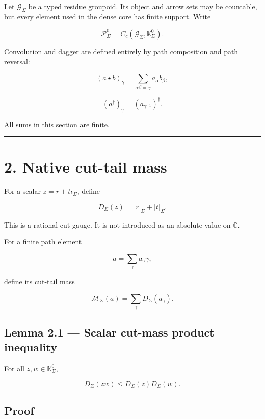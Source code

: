Let \(\mathscr G_\Sigma\) be a typed residue groupoid. Its object and arrow sets
may be countable, but every element used in the dense core has finite support.
Write

\[
\mathscr P_\Sigma^0
=
C_c(\mathscr G_\Sigma,\mathbb K_\Sigma^0).
\]

Convolution and dagger are defined entirely by path composition and path
reversal:

\[
(a\star b)_\gamma
=
\sum_{\alpha\beta=\gamma}a_\alpha b_\beta,
\tag{1.2}
\]

\[
(a^\dagger)_\gamma
=
(a_{\gamma^{-1}})^\dagger.
\tag{1.3}
\]

All sums in this section are finite.

\begin{center}\rule{0.5\linewidth}{0.5pt}\end{center}

\hypertarget{native-cut-tail-mass}{%
\section{2. Native cut-tail mass}\label{native-cut-tail-mass}}

For a scalar \(z=r+t\iota_\Sigma\), define

\[
D_\Sigma(z)=|r|_\Sigma+|t|_\Sigma.
\tag{2.1}
\]

This is a rational cut gauge. It is not introduced as an absolute value on
\(\mathbb C\).

For a finite path element

\[
a=\sum_\gamma a_\gamma\gamma,
\]

define its cut-tail mass

\[
\boxed{
\mathcal M_\Sigma(a)
=
\sum_\gamma D_\Sigma(a_\gamma).
}
\tag{2.2}
\]

\hypertarget{lemma-2.1-scalar-cut-mass-product-inequality}{%
\subsection{Lemma 2.1 --- Scalar cut-mass product inequality}\label{lemma-2.1-scalar-cut-mass-product-inequality}}

For all \(z,w\in\mathbb K_\Sigma^0\),

\[
D_\Sigma(zw)
\le
D_\Sigma(z)D_\Sigma(w).
\tag{2.3}
\]

\hypertarget{proof}{%
\subsection{Proof}\label{proof}}

